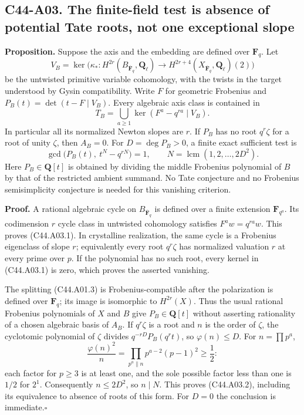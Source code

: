 \subsection*{C44-A03. The finite-field test is absence of potential Tate roots, not one exceptional slope}

\textbf{Proposition.}
Suppose the axis and the embedding are defined over $\mathbf F_q$.
Let
\[
 V_B=\ker\bigl(\kappa_*:H^{2r}(B_{\overline{\mathbf F}_q},
 \mathbf Q_\ell)\longrightarrow H^{2r+4}(X_{\overline{\mathbf F}_q},
 \mathbf Q_\ell)(2)\bigr)
\]
be the untwisted primitive variable cohomology, with the twists in
the target understood by Gysin compatibility. Write $F$ for
geometric Frobenius and $P_B(t)=\det(t-F\mid V_B)$.
Every algebraic axis class is contained in
\[
 T_B=\bigcup_{a\ge1}\ker(F^a-q^{ra}\mid V_B).                \tag{C44.A03.1}
\]
In particular all its normalized Newton slopes are $r$.
If $P_B$ has no root $q^r\zeta$ for a root of unity $\zeta$,
then $A_B=0$.
For $D=\deg P_B>0$, a finite exact sufficient test is
\[
 \gcd\bigl(P_B(t),\ t^N-q^{rN}\bigr)=1,
 \qquad N=\operatorname{lcm}(1,2,\ldots,2D^2).               \tag{C44.A03.2}
\]
Here $P_B\in\mathbf Q[t]$ is obtained by dividing the middle
Frobenius polynomial of $B$ by that of the restricted ambient
summand. No Tate conjecture and no Frobenius semisimplicity
conjecture is needed for this vanishing criterion.

\textbf{Proof.}
A rational algebraic cycle on $B_{\overline{\mathbf F}_q}$ is
defined over a finite extension $\mathbf F_{q^a}$. Its codimension
$r$ cycle class in untwisted cohomology satisfies $F^a w=q^{ra}w$.
This proves (C44.A03.1). In crystalline realization, the same
cycle is a Frobenius eigenclass of slope $r$; equivalently every
root $q^r\zeta$ has normalized valuation $r$ at every prime over
$p$.
If the polynomial has no such root, every kernel in (C44.A03.1)
is zero, which proves the asserted vanishing.

The splitting (C44.A01.3) is Frobenius-compatible after the
polarization is defined over $\mathbf F_q$; its image is isomorphic
to $H^{2r}(X)$. Thus the usual rational Frobenius polynomials of
$X$ and $B$ give $P_B\in\mathbf Q[t]$ without asserting
rationality of a chosen algebraic basis of $A_B$.
If $q^r\zeta$ is a root and $n$ is the order of $\zeta$, the
cyclotomic polynomial of $\zeta$ divides
$q^{-rD}P_B(q^rt)$, so $\varphi(n)\le D$.
For $n=\prod p^a$,
\[
 \frac{\varphi(n)^2}{n}=\prod_{p^a\parallel n}p^{a-2}(p-1)^2
 \ge\frac12:
\]
each factor for $p\ge3$ is at least one, and the sole possible
factor less than one is $1/2$ for $2^1$. Consequently $n\le2D^2$,
so $n\mid N$. This proves (C44.A03.2), including its equivalence
to absence of roots of this form. For $D=0$ the conclusion is
immediate.\hfill$\square$


